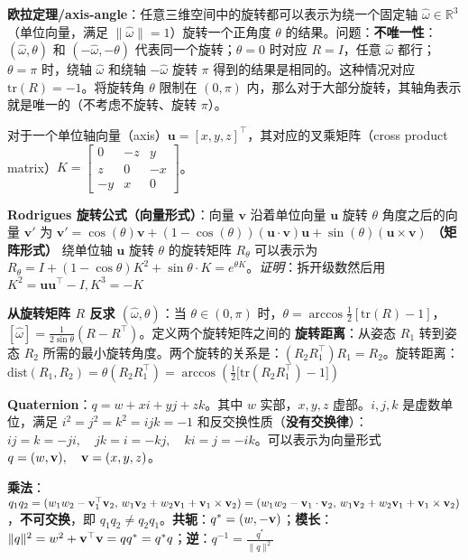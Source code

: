 \documentclass[
  8pt]{extarticle}
\begin{document}
\begin{multicols*}{4}
\textbf{欧拉定理/axis-angle}：任意三维空间中的旋转都可以表示为绕一个固定轴
\(\hat{\omega} \in \mathbb{R}^3\)（单位向量，满足
\(\|\hat{\omega}\| = 1\)）旋转一个正角度 \(\theta\)
的结果。问题：\textbf{不唯一性}：\((\hat{\omega}, \theta)\) 和
\((-\hat{\omega}, -\theta)\) 代表同一个旋转；\(\theta=0\) 时对应
\(R=I\)，任意 \(\hat{\omega}\) 都行；\(\theta = \pi\) 时，绕轴
\(\hat{\omega}\) 和绕轴 \(-\hat{\omega}\) 旋转 \(\pi\)
得到的结果是相同的。这种情况对应 \(\text{tr}(R) = -1\)。将旋转角
\(\theta\) 限制在 \((0, \pi)\)
内，那么对于大部分旋转，其轴角表示就是唯一的（不考虑不旋转、旋转
\(\pi\)）。

对于一个单位轴向量（axis）\(\mathbf{u} = [x, y, z]^\top\)，其对应的叉乘矩阵（cross
product
matrix）\(K = \begin{bmatrix}0 & -z & y \\z & 0 & -x \\-y & x & 0\end{bmatrix}\)。

\textbf{Rodrigues 旋转公式（向量形式）}：向量 \(\mathbf{v}\)
沿着单位向量 \(\mathbf{u}\) 旋转 \(\theta\) 角度之后的向量
\(\mathbf{v}'\) 为
\(\mathbf{v}' = \cos(\theta)\mathbf{v} + (1 - \cos(\theta))(\mathbf{u} \cdot \mathbf{v})\mathbf{u} + \sin(\theta)(\mathbf{u} \times \mathbf{v})\)
\textbf{（矩阵形式）} 绕单位轴 \(\mathbf{u}\) 旋转 \(\theta\) 的旋转矩阵
\(R_\theta\) 可以表示为
\(R_\theta = I + (1-\cos\theta) K^2 + \sin\theta \cdot K = e^{\theta K}\)。\emph{证明}：拆开级数然后用
\(K^2 = \mathbf{u}\mathbf{u}^\top - I,K^3=-K\)

\textbf{从旋转矩阵 \(R\) 反求 \((\hat{\omega}, \theta)\)}：当
\(\theta \in (0, \pi)\)
时，\(\theta = \arccos \frac{1}{2}[\text{tr}(R) - 1]\)，\([\hat{\omega}] = \frac{1}{2 \sin \theta}(R - R^\top)\)。定义两个旋转矩阵之间的
\textbf{旋转距离}：从姿态 \(R_1\) 转到姿态 \(R_2\)
所需的最小旋转角度。两个旋转的关系是：\((R_2 R_1^\top) R_1 = R_2\)。旋转距离：\(\text{dist}(R_1, R_2) = \theta(R_2 R_1^\top) = \arccos\left(\frac{1}{2} \big[\text{tr}(R_2 R_1^\top) - 1\big]\right)\)

\textbf{Quaternion}：\(q = w + xi + yj + zk\)。其中 \(w\)
实部，\(x,y,z\) 虚部。\(i, j, k\) 是虚数单位，满足
\(i^2 = j^2 = k^2 = ijk = -1\)
和反交换性质（\textbf{没有交换律}）：\(ij = k = -ji, \quad jk = i = -kj, \quad ki = j = -ik\)。可以表示为向量形式
\(q = (w, \bold{v}), \quad \bold{v} = (x, y, z)\)。

\textbf{乘法}：\(q_1 q_2 = (w_1 w_2 - \bold{v}_1^{\top} \bold{v}_2, \, w_1 \bold{v}_2 + w_2 \bold{v}_1 + \bold{v}_1 \times \bold{v}_2) = (w_1 w_2 - \bold{v}_1 \cdot \bold{v}_2, \, w_1 \bold{v}_2 + w_2 \bold{v}_1 + \bold{v}_1 \times \bold{v}_2)\)，\textbf{不可交换}，即
\(q_1 q_2 \neq q_2 q_1\)。\textbf{共轭}：\(q^* = (w, -\bold{v})\)；\textbf{模长}：\(\|q\|^2 = w^2 + \bold{v}^{\top} \bold{v} = qq^* = q^*q\)；\textbf{逆}：\(q^{-1} = \frac{q^*}{\|q\|^2}\)


\end{multicols*}
\end{document}
